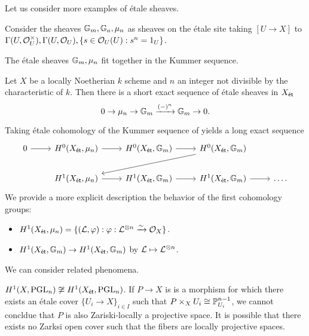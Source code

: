 Let us consider more examples of \'{e}tale sheaves. 
\begin{example}
    Consider the sheaves $\mathbb{G}_{m},\mathbb{G}_{a},\mu_{n}$ as sheaves on the \'{e}tale site taking $[U\to X]$ to $\Gamma(U,\mathcal{O}_{U}^{\times}), \Gamma(U,\mathcal{O}_{U}), \{s\in\mathcal{O}_{U}(U):s^{n}=1_{U}\}$. 
\end{example}
The \'{e}tale sheaves $\mathbb{G}_{m},\mu_{n}$ fit together in the Kummer sequence. 
\begin{proposition}\label{prop: Kummer sequence}
    Let $X$ be a locally Noetherian $k$ scheme and $n$ an integer not divisible by the characteristic of $k$. Then there is a short exact sequence of \'{e}tale sheaves in $X_{\mathsf{\acute{e}t}}$
    $$0\to\mu_{n}\to\mathbb{G}_{m}\xrightarrow{(-)^{n}}\mathbb{G}_{m}\to0.$$
\end{proposition}
Taking \'{e}tale cohomology of the Kummer sequence of  yields a long exact sequence 
$$%
\begin{tikzcd}
	0 & {H^{0}(X_{\et},\mu_{n})} & {H^{0}(X_{\et},\GG_{m})} & {H^{0}(X_{\et},\GG_{m})} \\
	& {H^{1}(X_{\et},\mu_{n})} & {H^{1}(X_{\et},\GG_{m})} & {H^{1}(X_{\et},\GG_{m})} & {\dots.}
	\arrow[from=1-1, to=1-2]
	\arrow[from=1-2, to=1-3]
	\arrow[from=1-3, to=1-4]
	\arrow[from=1-4, to=2-2]
	\arrow[from=2-2, to=2-3]
	\arrow[from=2-3, to=2-4]
	\arrow[from=2-4, to=2-5]
\end{tikzcd}$$
We provide a more explicit description the behavior of the first cohomology groups: 
\begin{itemize}
    \item $H^{1}(X_{\mathsf{\acute{e}t}},\mu_{n})=\{(\mathcal{L},\varphi):\varphi:\mathcal{L}^{\otimes n}\xrightarrow{\sim}\mathcal{O}_{X}\}$. 
    \item $H^{1}(X_{\mathsf{\acute{e}t}},\mathbb{G}_{m})\to H^{1}(X_{\mathsf{\acute{e}t}},\mathbb{G}_{m})$ by $\mathcal{L}\mapsto\mathcal{L}^{\otimes n}$. 
\end{itemize}
We can consider related phenomena. 
\begin{example}
    $H^{1}(X,\mathrm{PGL}_{n})\not\cong H^{1}(X_{\mathsf{\acute{e}t}},\mathrm{PGL}_{n})$. If $P\to X$ is is a morphism for which there exists an \'{e}tale cover $\{U_{i}\to X\}_{i\in I}$ such that $P\times_{X}U_{i}\cong\mathbb{P}^{n-1}_{U_{i}}$, we cannot concldue that $P$ is also Zariski-locally a projective space. It is possible that there exists no Zarksi open cover such that the fibers are locally projective spaces. 
\end{example}

